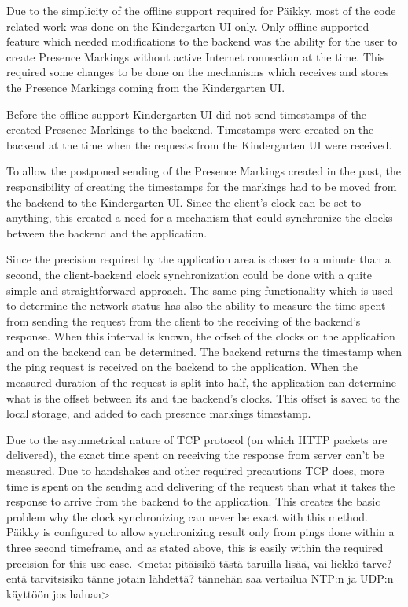 Due to the simplicity of the offline support required for Päikky, most of the code related work was done on the Kindergarten UI only. Only offline supported feature which needed modifications to the backend was the ability for the user to create Presence Markings without active Internet connection at the time. This required some changes to be done on the mechanisms which receives and stores the Presence Markings coming from the Kindergarten UI. 

Before the offline support Kindergarten UI did not send timestamps of the created Presence Markings to the backend. Timestamps were created on the backend at the time when the requests from the Kindergarten UI were received. 

To allow the postponed sending of the Presence Markings created in the past, the responsibility of creating the timestamps for the markings had to be moved from the backend to the Kindergarten UI. Since the client's clock can be set to anything, this created a need for a mechanism that could synchronize the clocks between the backend and the application.

Since the precision required by the application area is closer to a minute than a second, the client-backend clock synchronization could be done with a quite simple and straightforward approach. The same ping functionality which is used to determine the network status has also the ability to measure the time spent from sending the request from the client to the receiving of the backend's response. When this interval is known, the offset of the clocks on the application and on the backend can be determined. The backend returns the timestamp when the ping request is received on the backend to the application. When the measured duration of the request is split into half, the application can determine what is the offset between its and the backend's clocks. This offset is saved to the local storage, and added to each presence markings timestamp. 


Due to the asymmetrical nature of TCP protocol (on which HTTP packets are delivered), the exact time spent on receiving the response from server can't be measured. Due to handshakes and other required precautions TCP does, more time is spent on the sending and delivering of the request than what it takes the response to arrive from the backend to the application. This creates the basic problem why the clock synchronizing can never be exact with this method. Päikky is configured to allow synchronizing result only from pings done within a three second timeframe, and as stated above, this is easily within the required precision for this use case. <meta: pitäisikö tästä taruilla lisää, vai liekkö tarve? entä tarvitsisiko tänne jotain lähdettä? tännehän saa vertailua NTP:n ja UDP:n käyttöön jos haluaa>






